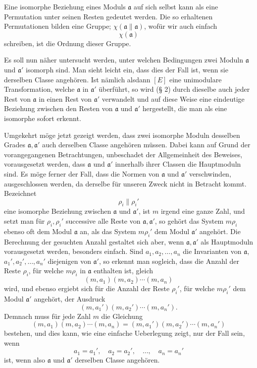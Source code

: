 \documentclass[11pt,a4paper]{article}
\begin{document}
Eine isomorphe Beziehung eines Moduls $\mathfrak a$ auf sich selbst kann als eine Permutation unter seinen Resten gedeutet werden. Die so erhaltenen Permutationen bilden eine Gruppe; $\chi(\mathfrak a\parallel\mathfrak a)$, wofür wir auch einfach
\[
 \chi(\mathfrak a)
\]
schreiben, ist die Ordnung dieser Gruppe.

Es soll nun näher untersucht werden, unter welchen Bedingungen zwei Moduln $\mathfrak a$ und $\mathfrak a'$ isomorph sind. Man sieht leicht ein, dass dies der Fall ist, wenn sie derselben Classe angehören. Ist nämlich alsdann $[E]$ eine unimodulare Transformation, welche $\mathfrak a$ in $\mathfrak a'$ überführt, so wird (§ 2) durch dieselbe auch jeder Rest von $\mathfrak a$ in einen Rest von $\mathfrak a'$ verwandelt und auf diese Weise eine eindeutige Beziehung zwischen den Resten von $\mathfrak a$ und $\mathfrak a'$ hergestellt, die man als eine isomorphe sofort erkennt.

Umgekehrt möge jetzt gezeigt werden, dass zwei isomorphe Moduln desselben Grades $\mathfrak a,\mathfrak a'$ auch derselben Classe angehören müssen. Dabei kann auf Grund der vorangegangenen Betrachtungen, unbeschadet der Allgemeinheit des Beweises, vorausgesetzt werden, dass $\mathfrak a$ und $\mathfrak a'$ innerhalb ihrer Classen die Hauptmoduln sind. Es möge ferner der Fall, dass die Normen von $\mathfrak a$ und $\mathfrak a'$ verschwinden, ausgeschlossen werden, da derselbe für unseren Zweck nicht in Betracht kommt. Bezeichnet
\[
 \rho_i\parallel \rho_i'
\]
eine isomorphe Beziehung zwischen $\mathfrak a$ und $\mathfrak a'$, ist $m$ irgend eine ganze Zahl, und setzt man für $\rho_i,\rho_i'$ successive alle Reste von $\mathfrak a,\mathfrak a'$, so gehört das System $m\rho_i$ ebenso oft dem Modul $\mathfrak a$ an, als das System $m\rho_i'$ dem Modul $\mathfrak a'$ angehört. Die Berechnung der gesuchten Anzahl gestaltet sich aber, wenn $\mathfrak a,\mathfrak a'$ als Hauptmoduln vorausgesetzt werden, besonders einfach. Sind $a_1,a_2,\ldots,a_n$ die Invarianten von $\mathfrak a$, $a_1',a_2',\ldots,a_n'$ diejenigen von $\mathfrak a'$, so erkennt man sogleich, dass die Anzahl der Reste $\rho_i$, für welche $m\rho_i$ in $\mathfrak a$ enthalten ist, gleich
\[
 (m,a_1)(m,a_2)\cdots(m,a_n)
\]
wird, und ebenso ergiebt sich für die Anzahl der Reste $\rho_i'$, für welche $m\rho_i'$ dem Modul $\mathfrak a'$ angehört, der Ausdruck
\[
 (m,a_1')(m,a_2')\cdots(m,a_n').
\]
Demnach muss für jede Zahl $m$ die Gleichung
\[
 (m,a_1)(m,a_2)\cdots(m,a_n)=(m,a_1')(m,a_2')\cdots(m,a_n')
\]
bestehen, und dies kann, wie eine einfache Ueberlegung zeigt, nur der Fall sein, wenn
\[
 a_1=a_1',\quad a_2=a_2',\quad\ldots,\quad a_n=a_n'
\]
ist, wenn also $\mathfrak a$ und $\mathfrak a'$ derselben Classe angehören.
\end{document}
